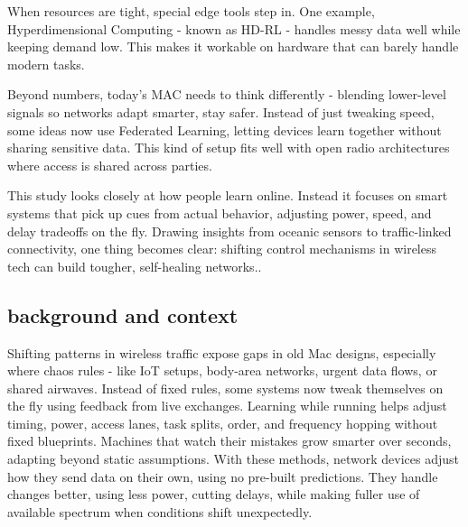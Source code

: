 \documentclass[a4paper,fleqn]{cas-dc}
\numberwithin{equation}{section}
\begin{document}
When resources are tight, special edge tools step in. One example, Hyperdimensional Computing - known as HD-RL - handles messy data well while keeping demand low. This makes it workable on hardware that can barely handle modern tasks.

Beyond numbers, today’s MAC needs to think differently - blending lower-level signals so networks adapt smarter, stay safer. Instead of just tweaking speed, some ideas now use Federated Learning, letting devices learn together without sharing sensitive data. This kind of setup fits well with open radio architectures where access is shared across parties.

This study looks closely at how people learn online. Instead it focuses on smart systems that pick up cues from actual behavior, adjusting power, speed, and delay tradeoffs on the fly. Drawing insights from oceanic sensors to traffic-linked connectivity, one thing becomes clear: shifting control mechanisms in wireless tech can build tougher, self-healing networks.. 
\subsection{background and context}
Shifting patterns in wireless traffic expose gaps in old Mac designs, especially where chaos rules - like IoT setups, body-area networks, urgent data flows, or shared airwaves. Instead of fixed rules, some systems now tweak themselves on the fly using feedback from live exchanges. Learning while running helps adjust timing, power, access lanes, task splits, order, and frequency hopping without fixed blueprints. Machines that watch their mistakes grow smarter over seconds, adapting beyond static assumptions. With these methods, network devices adjust how they send data on their own, using no pre-built predictions. They handle changes better, using less power, cutting delays, while making fuller use of available spectrum when conditions shift unexpectedly.
\end{document}
